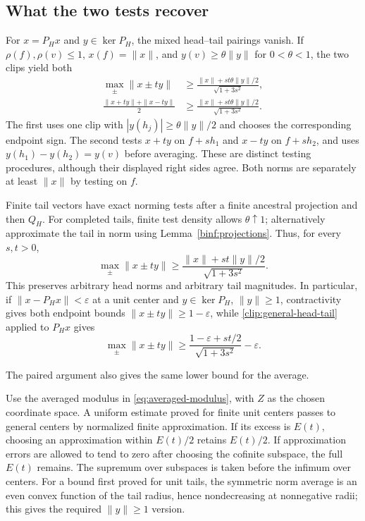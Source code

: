 \subsection{What the two tests recover}\label{clip:testing}

For $x=P_Hx$ and $y\in\ker P_H$, the mixed head--tail pairings
vanish. If $\rho(f),\rho(v)\le1$, $x(f)=\|x\|$, and
$y(v)\ge\theta\|y\|$ for $0<\theta<1$, the two clips yield both
\begin{align}
 \max_\pm\|x\pm ty\|&\ge
 \frac{\|x\|+st\theta\|y\|/2}{\sqrt{1+3s^2}},
 \label{clip:max-testing}\\
 \frac{\|x+ty\|+\|x-ty\|}{2}&\ge
 \frac{\|x\|+st\theta\|y\|/2}{\sqrt{1+3s^2}}.
 \label{clip:paired-testing}
\end{align}
The first uses one clip with $|y(h_j)|\ge\theta\|y\|/2$ and
chooses the corresponding endpoint sign. The second tests $x+ty$ on
$f+sh_1$ and $x-ty$ on $f+sh_2$, and uses
$y(h_1)-y(h_2)=y(v)$ before averaging. These are distinct testing
procedures, although their displayed right sides agree. Both norms
are separately at least $\|x\|$ by testing on $f$.

Finite tail vectors have exact norming tests after a finite ancestral
projection and then $Q_H$. For completed tails, finite test density
allows $\theta\uparrow1$; alternatively approximate the tail in norm
using Lemma~\ref{binf:projections}. Thus, for every $s,t>0$,
\begin{equation}\label{clip:general-head-tail}
 \max_\pm\|x\pm ty\|\ge
 \frac{\|x\|+st\|y\|/2}{\sqrt{1+3s^2}}.
\end{equation}
This preserves arbitrary head norms and arbitrary tail magnitudes.
In particular, if $\|x-P_Hx\|<\varepsilon$ at a unit center and
$y\in\ker P_H$, $\|y\|\ge1$, contractivity gives both endpoint
bounds $\|x\pm ty\|\ge1-\varepsilon$, while
\eqref{clip:general-head-tail} applied to $P_Hx$ gives
\[
 \max_\pm\|x\pm ty\|\ge
 \frac{1-\varepsilon+st/2}{\sqrt{1+3s^2}}-\varepsilon.
\]

The paired argument also gives the same lower bound for the average.

Use the averaged modulus in \eqref{eq:averaged-modulus}, with $Z$
as the chosen coordinate space. A uniform estimate proved for finite unit centers passes to general
centers by normalized finite approximation. If its excess is $E(t)$,
choosing an approximation within $E(t)/2$ retains $E(t)/2$.
If approximation errors are allowed to tend to zero after choosing
the cofinite subspace, the full $E(t)$ remains. The supremum over
subspaces is taken before the infimum over centers. For a bound first
proved for unit tails, the symmetric norm average is an even convex
function of the tail radius, hence nondecreasing at nonnegative radii;
this gives the required $\|y\|\ge1$ version.

